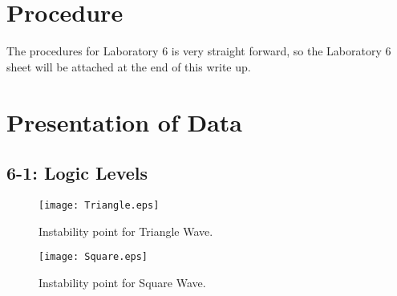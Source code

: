 \documentclass[%
 aip,
 jmp,
 amsmath,
 amssymb,
 reprint,%
 numerical,
 longbibliography,
]{revtex4-1}
\begin{document}
\section{Procedure}

The procedures for Laboratory 6 is very straight forward, so the Laboratory 6 sheet will be attached at the end of this write up.

\section{Presentation of Data}

	\subsection{6-1: Logic Levels}
	
	
	
	\begin{figure}[H]
	\texttt{[image: Triangle.eps]}
	\caption{Instability point for Triangle Wave.}
	\end{figure}
	
	\begin{figure}[H]
	\texttt{[image: Square.eps]}
	\caption{Instability point for Square Wave.}
	\end{figure}
		
\end{document}
